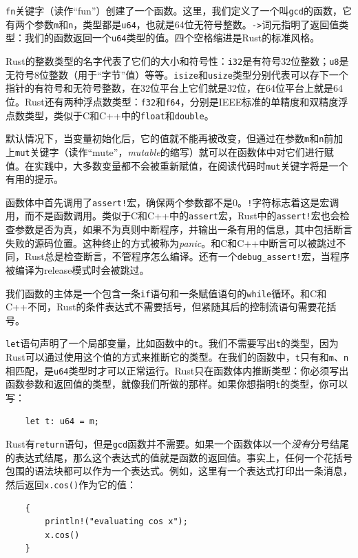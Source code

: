 \texttt{fn}关键字（读作“fun”）创建了一个函数。这里，我们定义了一个叫\texttt{gcd}的函数，它有两个参数\texttt{m}和\texttt{n}，类型都是\texttt{u64}，也就是64位无符号整数。\texttt{->}词元指明了返回值类型：我们的函数返回一个\texttt{u64}类型的值。四个空格缩进是Rust的标准风格。

Rust的整数类型的名字代表了它们的大小和符号性：\texttt{i32}是有符号32位整数；\texttt{u8}是无符号8位整数（用于“字节”值）等等。\texttt{isize}和\texttt{usize}类型分别代表可以存下一个指针的有符号和无符号整数，在32位平台上它们就是32位，在64位平台上就是64位。Rust还有两种浮点数类型：\texttt{f32}和\texttt{f64}，分别是IEEE标准的单精度和双精度浮点数类型，类似于C和C++中的\texttt{float}和\texttt{double}。

默认情况下，当变量初始化后，它的值就不能再被改变，但通过在参数\texttt{m}和\texttt{n}前加上\texttt{mut}关键字（读作“mute”，\emph{mutable}的缩写）就可以在函数体中对它们进行赋值。在实践中，大多数变量都不会被重新赋值，在阅读代码时\texttt{mut}关键字将是一个有用的提示。

函数体中首先调用了\texttt{assert!}宏，确保两个参数都不是0。\texttt{!}字符标志着这是宏调用，而不是函数调用。类似于C和C++中的\texttt{assert}宏，Rust中的\texttt{assert!}宏也会检查参数是否为真，如果不为真则中断程序，并输出一条有用的信息，其中包括断言失败的源码位置。这种终止的方式被称为\emph{panic}。和C和C++中断言可以被跳过不同，Rust总是检查断言，不管程序怎么编译。还有一个\texttt{debug\_assert!}宏，当程序被编译为release模式时会被跳过。

我们函数的主体是一个包含一条\texttt{if}语句和一条赋值语句的\texttt{while}循环。和C和C++不同，Rust的条件表达式不需要括号，但紧随其后的控制流语句需要花括号。

\texttt{let}语句声明了一个局部变量，比如函数中的\texttt{t}。我们不需要写出\texttt{t}的类型，因为Rust可以通过使用这个值的方式来推断它的类型。在我们的函数中，\texttt{t}只有和\texttt{m}、\texttt{n}相匹配，是\texttt{u64}类型时才可以正常运行。Rust只在函数体内推断类型：你必须写出函数参数和返回值的类型，就像我们所做的那样。如果你想指明\texttt{t}的类型，你可以写：
\begin{verbatim}
    let t: u64 = m;
\end{verbatim}

Rust有\texttt{return}语句，但是\texttt{gcd}函数并不需要。如果一个函数体以一个\emph{没有}分号结尾的表达式结尾，那么这个表达式的值就是函数的返回值。事实上，任何一个花括号包围的语法块都可以作为一个表达式。例如，这里有一个表达式打印出一条消息，然后返回\texttt{x.cos()}作为它的值：
\begin{verbatim}
    {
        println!("evaluating cos x");
        x.cos()
    }
\end{verbatim}

